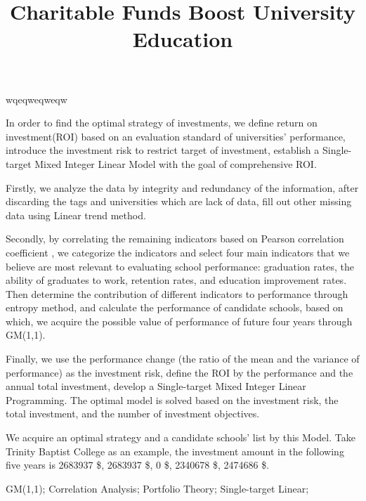 \documentclass{mcmthesis}
\title{Charitable Funds Boost University Education}
\begin{document}
\begin{sheetsummary}
wqeqweqweqw
\par In order to find the optimal strategy of investments, we define return on investment(ROI) based on an evaluation standard of universities' performance, introduce the investment risk to restrict target of investment, establish a Single-target Mixed Integer Linear Model with the goal of comprehensive ROI.

\par Firstly, we analyze the data by integrity and redundancy of the information, after discarding the tags and universities which are lack of data, fill out other missing data using Linear trend method.

\par Secondly, by correlating the remaining indicators based on Pearson correlation coefficient
, we categorize the indicators and select four main indicators that we believe are most relevant to evaluating school performance: graduation rates, the ability of graduates to work, retention rates, and education improvement rates. Then determine the contribution of different indicators to performance through entropy method, and calculate the performance of candidate schools, based on which, we acquire the possible value of performance of future four years through GM(1,1).

\par Finally, we use the performance change (the ratio of the mean and the variance of performance) as the investment risk, define the ROI by the performance and the annual total investment, develop a Single-target Mixed Integer Linear Programming. The optimal model is solved based on the investment risk, the total investment, and the number of investment objectives.

\par We acquire an optimal strategy and a candidate schools’ list by this Model. Take Trinity Baptist College as an example, the investment amount in the following five years is 2683937 \$, 2683937 \$, 0 \$, 2340678 \$, 2474686 \$.

\end{sheetsummary}

\begin{abstract}
\end{abstract}

\begin{keywords}
GM(1,1); Correlation Analysis; Portfolio Theory; Single-target Linear;    
\end{keywords}
\end{document}
